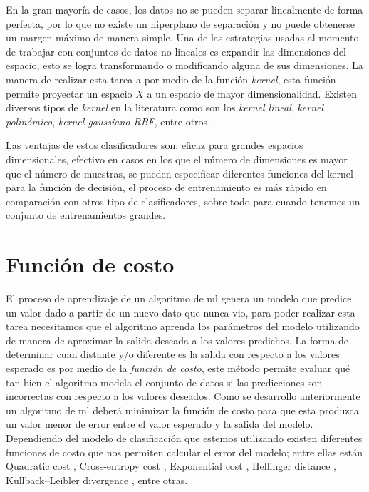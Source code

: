 En la gran mayoría de casos, los datos no se pueden separar linealmente de forma perfecta, por lo que no existe un hiperplano de separación y no puede obtenerse un margen máximo de manera simple. Una de las estrategias usadas al momento de trabajar con conjuntos de datos no lineales es expandir las dimensiones del espacio, esto se logra transformando o modificando alguna de sus dimensiones. La manera de realizar esta tarea a por medio de la función  \textit{kernel}, esta función permite proyectar un espacio $ X$ a un espacio de mayor dimensionalidad. Existen diversos tipos de \textit{kernel} en la literatura como son los \textit{kernel lineal}, \textit{kernel polinómico}, \textit{kernel gaussiano RBF}, entre otros \citep{SVM}. 


Las ventajas de estos clasificadores son: eficaz para grandes espacios dimensionales, efectivo en casos en los que el número de dimensiones es mayor que el número de muestras, se pueden especificar diferentes funciones del kernel para la función de decisión, el proceso de entrenamiento es más rápido en comparación con otros tipo de clasificadores, sobre todo para cuando tenemos un conjunto de entrenamientos grandes.

\section{Función de costo}\label{sub:funcion_costo}


El proceso de aprendizaje de un algoritmo de \ac{ml} genera un  modelo que predice un valor dado a partir de un nuevo dato que nunca vio, para poder realizar esta tarea necesitamos que el algoritmo aprenda los parámetros del modelo utilizando de manera de aproximar la salida deseada a los valores predichos. La forma de determinar cuan distante y/o diferente es la salida con respecto a los valores esperado es por medio de la \textit{función de costo}, este método permite evaluar qué tan bien el algoritmo modela el conjunto de datos si las predicciones son incorrectas con respecto a los valores deseados. Como se desarrollo anteriormente un algoritmo de \ac{ml} deberá minimizar la función de costo para que esta produzca un valor menor de error entre el valor esperado y la salida del modelo. Dependiendo del modelo de clasificación que estemos utilizando existen diferentes funciones de costo que nos permiten calcular el error del modelo; entre ellas están Quadratic cost \citep{quadratic_cost}, Cross-entropy cost \citep{cross_entropy}, Exponential cost \citep{exponential_cost}, Hellinger distance \citep{Hellinger}, Kullback–Leibler divergence \citep{kullback}, entre otras.

